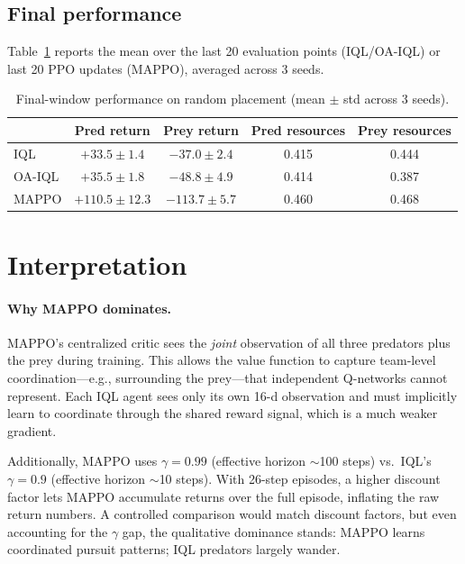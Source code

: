 \documentclass[11pt]{article}
\begin{document}
\subsection{Final performance}

Table~\ref{tab:results} reports the mean over the last 20 evaluation
points (IQL/OA-IQL) or last 20 PPO updates (MAPPO), averaged across
3 seeds.

\begin{table}[h]
  \centering
  \caption{Final-window performance on random placement (mean $\pm$
    std across 3 seeds).}\label{tab:results}
  \begin{tabular}{@{}lcccc@{}}
    \toprule
    & Pred return & Prey return & Pred resources & Prey resources \\
    \midrule
    IQL    & $+33.5 \pm 1.4$           & $-37.0 \pm 2.4$
           & 0.415                      & 0.444 \\
    OA-IQL & $+35.5 \pm 1.8$           & $-48.8 \pm 4.9$
           & 0.414                      & 0.387 \\
    MAPPO  & $\mathbf{+110.5 \pm 12.3}$& $\mathbf{-113.7 \pm 5.7}$
           & 0.460                      & 0.468 \\
    \bottomrule
  \end{tabular}
\end{table}


\section{Interpretation}

\paragraph{Why MAPPO dominates.}
MAPPO's centralized critic sees the \emph{joint} observation of all
three predators plus the prey during training.  This allows the value
function to capture team-level coordination---e.g., surrounding the
prey---that independent Q-networks cannot represent.  Each IQL agent
sees only its own 16-d observation and must implicitly learn to
coordinate through the shared reward signal, which is a much weaker
gradient.

Additionally, MAPPO uses $\gamma{=}0.99$ (effective horizon $\sim$100
steps) vs.\ IQL's $\gamma{=}0.9$ (effective horizon $\sim$10
steps).  With 26-step episodes, a higher discount factor lets MAPPO
accumulate returns over the full episode, inflating the raw return
numbers.  A controlled comparison would match discount factors, but
even accounting for the $\gamma$ gap, the qualitative dominance
stands: MAPPO learns coordinated pursuit patterns; IQL predators
largely wander.
\end{document}
